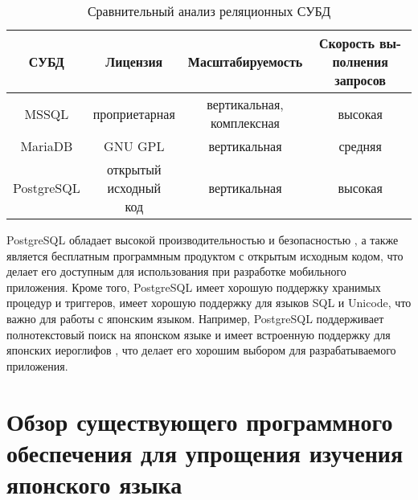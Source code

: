 \begin{table}[ht]
  \caption{Сравнительный анализ реляционных СУБД}
  \label{tab:rel-dbms}
  \begin{center}
    \begin{tabular}{|c|c|c|c|}
      \hline
      СУБД & Лицензия & Масштабируемость & \makecell{Скорость вы- \\ полнения запросов} \\
      \hline
      \hline
      MSSQL \cite{mssql} & проприетарная & \makecell{вертикальная, \\ комплексная} & высокая \\
      \hline
      MariaDB \cite{mariadb} & GNU GPL & вертикальная & средняя \\
      \hline
      PostgreSQL \cite{postgresql} & \makecell{открытый \\ исходный \\ код} & вертикальная & высокая  \\
      \hline
    \end{tabular}
  \end{center}
\end{table}

PostgreSQL обладает высокой производительностью и безопасностью \cite{relational-dbms},
а также является бесплатным программным продуктом с открытым
исходным кодом, что делает его доступным для использования при
разработке мобильного приложения. Кроме того, PostgreSQL имеет
хорошую поддержку хранимых процедур и триггеров, имеет хорошую
поддержку для языков SQL и Unicode, что важно для 
работы с японским языком. Например, PostgreSQL поддерживает 
полнотекстовый поиск на японском языке и имеет встроенную 
поддержку для японских иероглифов \cite{postgresql}, что делает его
хорошим выбором для разрабатываемого приложения.

\section{Обзор существующего программного обеспечения для упрощения изучения японского языка}

